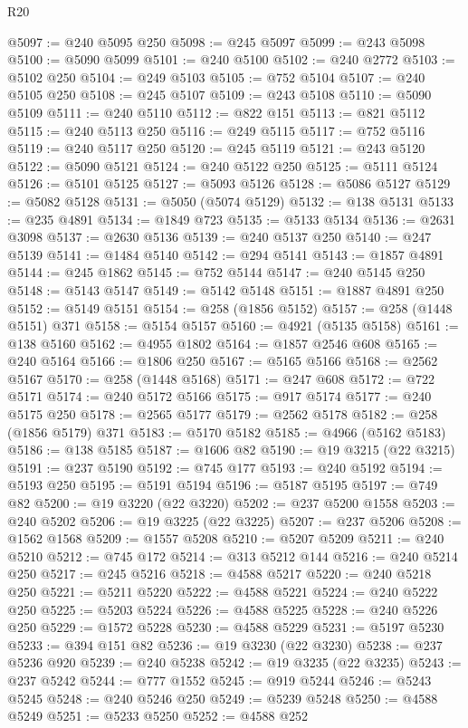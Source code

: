 \begin{lexlean}{R20}
\begin{coremodule}
{@5097 := @240 @5095 @250
@5098 := @245 @5097
@5099 := @243 @5098
@5100 := @5090 @5099
@5101 := @240 @5100
@5102 := @240 @2772
@5103 := @5102 @250
@5104 := @249 @5103
@5105 := @752 @5104
@5107 := @240 @5105 @250
@5108 := @245 @5107
@5109 := @243 @5108
@5110 := @5090 @5109
@5111 := @240 @5110
@5112 := @822 @151
@5113 := @821 @5112
@5115 := @240 @5113 @250
@5116 := @249 @5115
@5117 := @752 @5116
@5119 := @240 @5117 @250
@5120 := @245 @5119
@5121 := @243 @5120
@5122 := @5090 @5121
@5124 := @240 @5122 @250
@5125 := @5111 @5124
@5126 := @5101 @5125
@5127 := @5093 @5126
@5128 := @5086 @5127
@5129 := @5082 @5128
@5131 := @5050 (@5074 @5129)
@5132 := @138 @5131
@5133 := @235 @4891
@5134 := @1849 @723
@5135 := @5133 @5134
@5136 := @2631 @3098
@5137 := @2630 @5136
@5139 := @240 @5137 @250
@5140 := @247 @5139
@5141 := @1484 @5140
@5142 := @294 @5141
@5143 := @1857 @4891
@5144 := @245 @1862
@5145 := @752 @5144
@5147 := @240 @5145 @250
@5148 := @5143 @5147
@5149 := @5142 @5148
@5151 := @1887 @4891 @250
@5152 := @5149 @5151
@5154 := @258 (@1856 @5152)
@5157 := @258 (@1448 @5151) @371
@5158 := @5154 @5157
@5160 := @4921 (@5135 @5158)
@5161 := @138 @5160
@5162 := @4955 @1802
@5164 := @1857 @2546 @608
@5165 := @240 @5164
@5166 := @1806 @250
@5167 := @5165 @5166
@5168 := @2562 @5167
@5170 := @258 (@1448 @5168)
@5171 := @247 @608
@5172 := @722 @5171
@5174 := @240 @5172 @5166
@5175 := @917 @5174
@5177 := @240 @5175 @250
@5178 := @2565 @5177
@5179 := @2562 @5178
@5182 := @258 (@1856 @5179) @371
@5183 := @5170 @5182
@5185 := @4966 (@5162 @5183)
@5186 := @138 @5185
@5187 := @1606 @82
@5190 := @19 @3215 (@22 @3215)
@5191 := @237 @5190
@5192 := @745 @177
@5193 := @240 @5192
@5194 := @5193 @250
@5195 := @5191 @5194
@5196 := @5187 @5195
@5197 := @749 @82
@5200 := @19 @3220 (@22 @3220)
@5202 := @237 @5200 @1558
@5203 := @240 @5202
@5206 := @19 @3225 (@22 @3225)
@5207 := @237 @5206
@5208 := @1562 @1568
@5209 := @1557 @5208
@5210 := @5207 @5209
@5211 := @240 @5210
@5212 := @745 @172
@5214 := @313 @5212 @144
@5216 := @240 @5214 @250
@5217 := @245 @5216
@5218 := @4588 @5217
@5220 := @240 @5218 @250
@5221 := @5211 @5220
@5222 := @4588 @5221
@5224 := @240 @5222 @250
@5225 := @5203 @5224
@5226 := @4588 @5225
@5228 := @240 @5226 @250
@5229 := @1572 @5228
@5230 := @4588 @5229
@5231 := @5197 @5230
@5233 := @394 @151 @82
@5236 := @19 @3230 (@22 @3230)
@5238 := @237 @5236 @920
@5239 := @240 @5238
@5242 := @19 @3235 (@22 @3235)
@5243 := @237 @5242
@5244 := @777 @1552
@5245 := @919 @5244
@5246 := @5243 @5245
@5248 := @240 @5246 @250
@5249 := @5239 @5248
@5250 := @4588 @5249
@5251 := @5233 @5250
@5252 := @4588 @252
}
\end{coremodule}
\end{lexlean}
